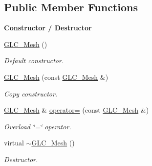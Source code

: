 \subsection*{Public Member Functions}
\begin{Indent}{\bf Constructor / Destructor}\par
\begin{DoxyCompactItemize}
\item 
\hyperlink{class_g_l_c___mesh_a6e5f26dbeeed25ff32d6e1eab78f8bb7}{G\-L\-C\-\_\-\-Mesh} ()
\begin{DoxyCompactList}\small\item\em Default constructor. \end{DoxyCompactList}\item 
\hyperlink{class_g_l_c___mesh_a4b240e7bc0318051509675a4efda3ae8}{G\-L\-C\-\_\-\-Mesh} (const \hyperlink{class_g_l_c___mesh}{G\-L\-C\-\_\-\-Mesh} \&)
\begin{DoxyCompactList}\small\item\em Copy constructor. \end{DoxyCompactList}\item 
\hyperlink{class_g_l_c___mesh}{G\-L\-C\-\_\-\-Mesh} \& \hyperlink{class_g_l_c___mesh_af2c28648d7f9fadb3565bd90bd22145e}{operator=} (const \hyperlink{class_g_l_c___mesh}{G\-L\-C\-\_\-\-Mesh} \&)
\begin{DoxyCompactList}\small\item\em Overload \char`\"{}=\char`\"{} operator. \end{DoxyCompactList}\item 
virtual \hyperlink{class_g_l_c___mesh_adf9a74adc4247d04c5f74d9709477243}{$\sim$\-G\-L\-C\-\_\-\-Mesh} ()
\begin{DoxyCompactList}\small\item\em Destructor. \end{DoxyCompactList}\end{DoxyCompactItemize}
\end{Indent}
